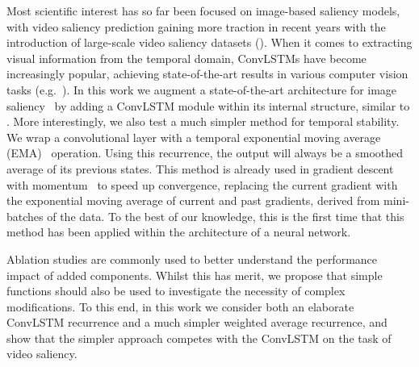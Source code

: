 \documentclass{bmvc2k}
\begin{document}
Most scientific interest has so far been focused on image-based saliency models, with video saliency prediction gaining more traction in recent years with the introduction of large-scale video saliency datasets (\cite{Wang2018a, Hollywood_UCF}). When it comes to extracting visual information from the temporal domain, ConvLSTMs have become increasingly popular, achieving state-of-the-art results in various computer vision tasks (e.g.~\cite{CLSTM,Wang2018a,xu2018youtube}). In this work we augment a state-of-the-art architecture for image saliency~\cite{Pan2017} by adding a ConvLSTM module within its internal structure, similar to \cite{Wang2018a,gorji2018going}. More interestingly, we also test a much simpler method for temporal stability. We wrap a convolutional layer with a temporal exponential moving average (EMA)~\cite{EMA} operation. Using this recurrence, the output will always be a smoothed average of its previous states. This method is already used in gradient descent with momentum~\cite{momentumDL} to speed up convergence, replacing the current gradient with the exponential moving average of current and past gradients, derived from mini-batches of the data. To the best of our knowledge, this is the first time that this method has been applied within the architecture of a neural network.  

Ablation studies are commonly used to better understand the performance impact of added components. Whilst this has merit, we propose that simple functions should also be used to investigate the necessity of complex modifications. To this end, in this work we consider both an elaborate ConvLSTM recurrence and a much simpler weighted average recurrence, and show that the simpler approach competes with the ConvLSTM on the task of video saliency.
\end{document}
